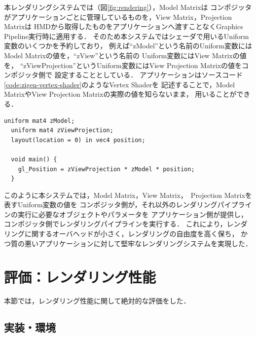 本レンダリングシステムでは（図\ref{fig:rendering}），Model Matrixは
コンポジッタがアプリケーションごとに管理しているものを，View Matrix，Projection Matrixは
HMDから取得したものをアプリケーションへ渡すことなくGraphics Pipeline実行時に適用する．
そのため本システムではシェーダで用いるUniform変数のいくつかを予約しており，
例えば``zModel''という名前のUniform変数にはModel Matrixの値を，``zView''という名前の
Uniform変数にはView Matrixの値を，
``zViewProjection''というUniform変数にはView Projection Matrixの値をコンポジッタ側で
設定することとしている．
アプリケーションはソースコード\ref{code:zigen-vertex-shader}のようなVertex Shaderを
記述することで，Model MatrixやView Projection Matrixの実際の値を知らないまま，
用いることができる．

\begin{lstlisting}[caption=本システムでのVertex Shaderの例, label=code:zigen-vertex-shader]
  uniform mat4 zModel;
  uniform mat4 zViewProjection;
  layout(location = 0) in vec4 position;
  
  void main() {
    gl_Position = zViewProjection * zModel * position;
  }
\end{lstlisting}

このように本システムでは，Model Matrix，View Matrix，　Projection Matrixを表すUniform変数の値を
コンポジッタ側が，それ以外のレンダリングパイプラインの実行に必要なオブジェクトやパラメータを
アプリケーション側が提供し，コンポジッタ側でレンダリングパイプラインを実行する．
これにより，レンダリングに関するオーバヘッドが小さく，レンダリングの自由度を高く保ち，
かつ質の悪いアプリケーションに対して堅牢なレンダリングシステムを実現した．


\section{評価：レンダリング性能}

本節では，レンダリング性能に関して絶対的な評価をした．

\subsection{実装・環境}

